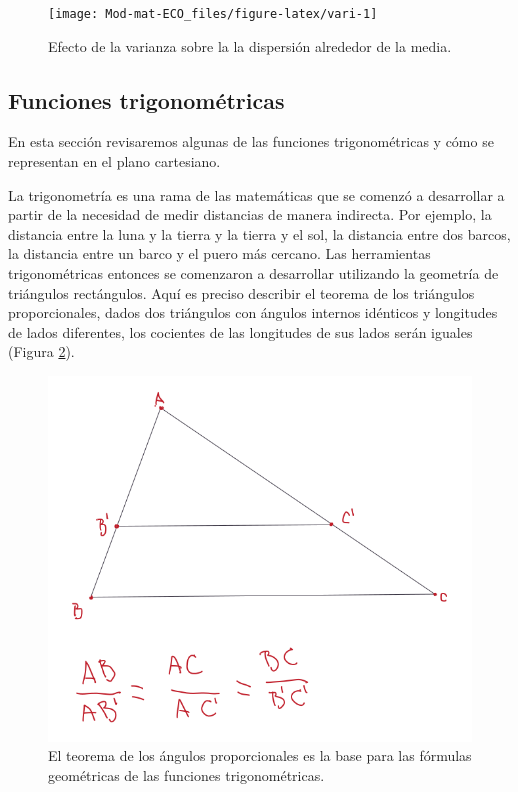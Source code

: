 \documentclass[
]{book}
\begin{document}
\begin{figure}

{\centering \texttt{[image: Mod-mat-ECO\_files/figure-latex/vari-1]} 

}

\caption{Efecto de  la varianza sobre la la dispersión alrededor de la media.}\label{fig:vari}
\end{figure}

\hypertarget{funciones-trigonomuxe9tricas}{%
\subsection{Funciones trigonométricas}\label{funciones-trigonomuxe9tricas}}

En esta sección revisaremos algunas de las funciones trigonométricas y cómo se representan en el plano cartesiano.

La trigonometría es una rama de las matemáticas que se comenzó a desarrollar a partir de la necesidad de medir distancias de manera indirecta. Por ejemplo, la distancia entre la luna y la tierra y la tierra y el sol, la distancia entre dos barcos, la distancia entre un barco y el puero más cercano. Las herramientas trigonométricas entonces se comenzaron a desarrollar utilizando la geometría de triángulos rectángulos. Aquí es preciso describir el teorema de los triángulos proporcionales, dados dos triángulos con ángulos internos idénticos y longitudes de lados diferentes, los cocientes de las longitudes de sus lados serán iguales (Figura \ref{fig:trian-prop}).

\begin{figure}

{\centering \includegraphics[width=8.97in]{Unidad-II/Trian-prop} 

}

\caption{El teorema de los ángulos proporcionales es la base para las fórmulas geométricas de las funciones trigonométricas.}\label{fig:trian-prop}
\end{figure}
\end{document}
